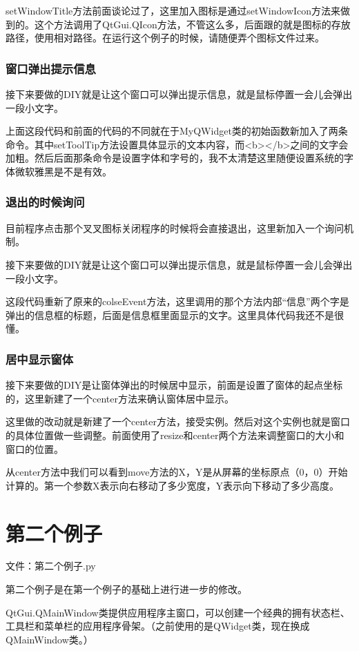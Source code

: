 \documentclass[12pt,oneside]{book}
\begin{document}
\begin{common-format}
setWindowTitle方法前面谈论过了，这里加入图标是通过setWindowIcon方法来做到的。这个方法调用了QtGui.QIcon方法，不管这么多，后面跟的就是图标的存放路径，使用相对路径。在运行这个例子的时候，请随便弄个图标文件过来。


\subsection{窗口弹出提示信息}
接下来要做的DIY就是让这个窗口可以弹出提示信息，就是鼠标停置一会儿会弹出一段小文字。

上面这段代码和前面的代码的不同就在于MyQWidget类的初始函数新加入了两条命令。其中setToolTip方法设置具体显示的文本内容，而<b></b>之间的文字会加粗。然后后面那条命令是设置字体和字号的，我不太清楚这里随便设置系统的字体微软雅黑是不是有效。


\subsection{退出的时候询问}
目前程序点击那个叉叉图标关闭程序的时候将会直接退出，这里新加入一个询问机制。

接下来要做的DIY就是让这个窗口可以弹出提示信息，就是鼠标停置一会儿会弹出一段小文字。

这段代码重新了原来的colseEvent方法，这里调用的那个方法内部“信息”两个字是弹出的信息框的标题，后面是信息框里面显示的文字。这里具体代码我还不是很懂。


\subsection{居中显示窗体}
接下来要做的DIY是让窗体弹出的时候居中显示，前面是设置了窗体的起点坐标的，这里新建了一个center方法来确认窗体居中显示。

这里做的改动就是新建了一个center方法，接受实例。然后对这个实例也就是窗口的具体位置做一些调整。前面使用了resize和center两个方法来调整窗口的大小和窗口的位置。

从center方法中我们可以看到move方法的X，Y是从屏幕的坐标原点（0，0）开始计算的。第一个参数X表示向右移动了多少宽度，Y表示向下移动了多少高度。


\chapter{第二个例子}
文件：第二个例子.py

第二个例子是在第一个例子的基础上进行进一步的修改。

QtGui.QMainWindow类提供应用程序主窗口，可以创建一个经典的拥有状态栏、工具栏和菜单栏的应用程序骨架。（之前使用的是QWidget类，现在换成QMainWindow类。）


\end{common-format}
\end{document}
